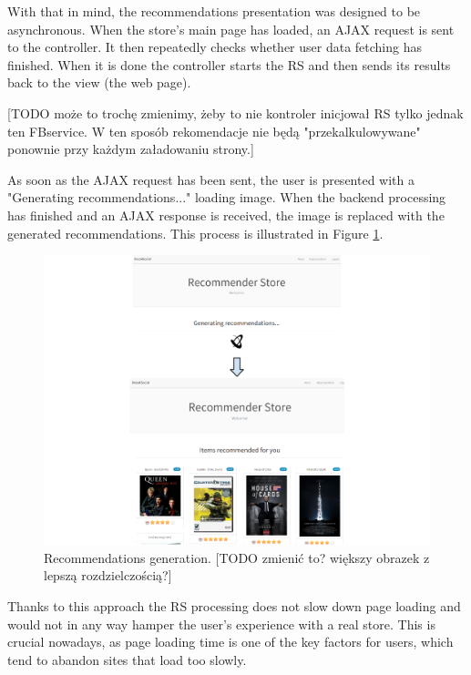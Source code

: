 \documentclass[12pt]{report}
\begin{document}
With that in mind, the recommendations presentation was designed to be asynchronous. When the store's main page has loaded, an AJAX request is sent to the controller. It then repeatedly checks whether user data fetching has finished. When it is done the controller starts the RS and then sends its results back to the view (the web page). 

[TODO może to trochę zmienimy, żeby to nie kontroler inicjował RS tylko jednak ten FBservice. W ten sposób rekomendacje nie będą "przekalkulowywane" ponownie przy każdym załadowaniu strony.]

As soon as the AJAX request has been sent, the user is presented with a "Generating recommendations..." loading image. When the backend processing has finished and an AJAX response is received, the image is replaced with the generated recommendations. This process is illustrated in Figure \ref{fig.reco_gen_done}.

\begin{figure}[!t]
\centering
\includegraphics[width=\textwidth]{reco_gen_done.png} 
\caption[Recommendations generation.]{Recommendations generation. [TODO zmienić to? większy obrazek z lepszą rozdzielczością?]}
\label{fig.reco_gen_done}
\end{figure}

\hbox{}
Thanks to this approach the RS processing does not slow down page loading and would not in any way hamper the user's experience with a real store. This is crucial nowadays, as page loading time is one of the key factors for users, which tend to abandon sites that load too slowly.
\end{document}
